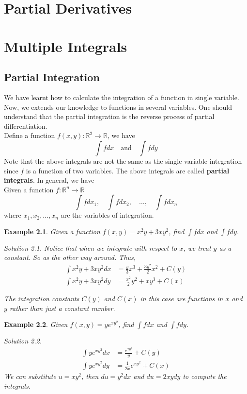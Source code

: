 \documentclass{book}
\newtheorem{example}{Example}[chapter]
\theoremstyle{remark}
\newtheorem*{solution}{Solution}
\newcommand{\R}{\mathbb{R}}
\begin{document}
\chapter{Partial Derivatives}


\chapter{Multiple Integrals}
\section{Partial Integration}
    We have learnt how to calculate the integration of a function in single variable. Now, we extends our knowledge to functions in several variables. One should understand that the partial integration is the reverse process of partial differentiation.
    \\\indent Define a function $f(x,y):\R^2\to\R$, we have 
    \[\int f dx \quad \text{and}\quad \int f dy\]
    Note that the above integrals are not the same as the single variable integration since $f$ is a function of two variables. The above integrals are called \textbf{partial integrals}. In general, we have 
    \\Given a function $f:\R^n \to \R$
    \[\int f dx_1,\quad \int f dx_2,\quad \dots ,\quad \int f dx_n\]
    where $x_1,x_2,\ldots,x_n$ are the variables of integration.
    \begin{example}
        Given a function $f(x,y)=x^2y+3xy^2$, find $\int f dx$ and $\int f dy$.
        \begin{solution}
            Notice that when we integrate with respect to $x$, we treat $y$ as a constant. So as the other way around. Thus, 
            \[
            \begin{split}
                \int x^2y+3xy^2 dx&= \frac{y}{3}x^3+\frac{3y^2}{2}x^2 +C(y)\\
                \int x^2y+3xy^2 dy&= \frac{x^2}{2}y^2+xy^3 +C(x)
            \end{split}
            \]
        \end{solution}
        The integration constants $C(y)$ and $C(x)$ in this case are functions in $x$ and $y$ rather than just a constant number.
    \end{example}

    \begin{example}
        Given $f(x,y)=ye^{xy^2}$, find $\int f dx$ and $\int f dy$.
        \begin{solution}
            \[
            \begin{split}
                \int ye^{xy^2} dx&= \frac{e^{xy^2}}{y}+C(y)\\
                \int ye^{xy^2} dy&= \frac{1}{2x}e^{xy^2}+C(x)
            \end{split}
            \]
            We can substitute $u=xy^2$, then $du=y^2dx$ and $du=2xy dy$ to compute the integrals.
        \end{solution}
    \end{example}
\end{document}
